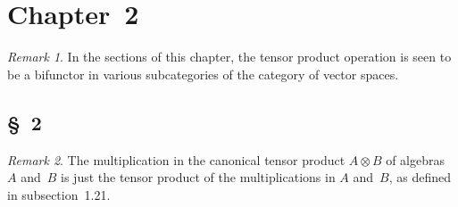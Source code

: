 \documentclass[letterpaper,12pt]{article}
\newcommand{\tprod}{\otimes}
\theoremstyle{definition}
\theoremstyle{remark}
\newtheorem*{rmk}{Remark}
\begin{document}
\newpage
\section*{Chapter~2}
\begin{rmk}
In the sections of this chapter, the tensor product operation is seen to be a bifunctor in various subcategories of the category of vector spaces.
\end{rmk}

\subsection*{\S~2}
\begin{rmk}
The multiplication in the canonical tensor product \(A\tprod B\) of algebras \(A\) and~\(B\) is just the tensor product of the multiplications in \(A\) and~\(B\), as defined in subsection~1.21.
\end{rmk}
\end{document}
